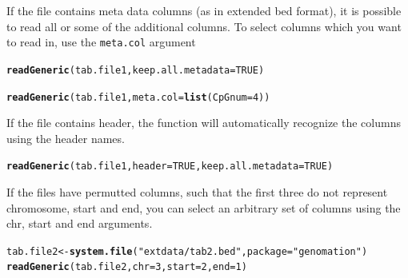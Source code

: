 \documentclass{article}\usepackage[]{graphicx}\usepackage[]{color}
\makeatletter
\newcommand{\hlnum}[1]{\textcolor[rgb]{0.686,0.059,0.569}{#1}}%
\newcommand{\hlstr}[1]{\textcolor[rgb]{0.192,0.494,0.8}{#1}}%
\newcommand{\hlstd}[1]{\textcolor[rgb]{0.345,0.345,0.345}{#1}}%
\newcommand{\hlkwb}[1]{\textcolor[rgb]{0.69,0.353,0.396}{#1}}%
\newcommand{\hlkwc}[1]{\textcolor[rgb]{0.333,0.667,0.333}{#1}}%
\newcommand{\hlkwd}[1]{\textcolor[rgb]{0.737,0.353,0.396}{\textbf{#1}}}%
\newenvironment{kframe}{%
 \def\at@end@of@kframe{}%
 \ifinner\ifhmode%
  \def\at@end@of@kframe{\end{minipage}}%
  \begin{minipage}{\columnwidth}%
 \fi\fi%
 \def\FrameCommand##1{\hskip\@totalleftmargin \hskip-\fboxsep
 \colorbox{shadecolor}{##1}\hskip-\fboxsep
     \hskip-\linewidth \hskip-\@totalleftmargin \hskip\columnwidth}%
 \MakeFramed {\advance\hsize-\width
   \@totalleftmargin\z@ \linewidth\hsize
   \@setminipage}}%
 {\par\unskip\endMakeFramed%
 \at@end@of@kframe}
\newenvironment{knitrout}{}{} %
\newcommand{\Rcode}[1]{{\texttt{#1}}}
\makeatother
\begin{document}
If the file contains meta data columns (as in extended bed format), 
it is possible to read all or some of the additional columns.
To select columns which you want to read in, use the \Rcode{meta.col} argument 
\begin{knitrout}
\color{fgcolor}\begin{kframe}
\begin{alltt}
\hlkwd{readGeneric}\hlstd{(tab.file1,} \hlkwc{keep.all.metadata} \hlstd{=} \hlnum{TRUE}\hlstd{)}

\hlkwd{readGeneric}\hlstd{(tab.file1,} \hlkwc{meta.col} \hlstd{=} \hlkwd{list}\hlstd{(}\hlkwc{CpGnum} \hlstd{=} \hlnum{4}\hlstd{))}
\end{alltt}
\end{kframe}
\end{knitrout}


If the file contains header, the function will automatically recognize the 
columns using the header names.
\begin{knitrout}
\color{fgcolor}\begin{kframe}
\begin{alltt}
\hlkwd{readGeneric}\hlstd{(tab.file1,} \hlkwc{header} \hlstd{=} \hlnum{TRUE}\hlstd{,} \hlkwc{keep.all.metadata} \hlstd{=} \hlnum{TRUE}\hlstd{)}
\end{alltt}
\end{kframe}
\end{knitrout}



If the files have permutted columns, such that the first three do not represent
chromosome, start and end, you can select an arbitrary set of columns using the
chr, start and end arguments.
\begin{knitrout}
\color{fgcolor}\begin{kframe}
\begin{alltt}
\hlstd{tab.file2} \hlkwb{<-} \hlkwd{system.file}\hlstd{(}\hlstr{"extdata/tab2.bed"}\hlstd{,} \hlkwc{package} \hlstd{=} \hlstr{"genomation"}\hlstd{)}
\hlkwd{readGeneric}\hlstd{(tab.file2,} \hlkwc{chr} \hlstd{=} \hlnum{3}\hlstd{,} \hlkwc{start} \hlstd{=} \hlnum{2}\hlstd{,} \hlkwc{end} \hlstd{=} \hlnum{1}\hlstd{)}
\end{alltt}
\end{kframe}
\end{knitrout}
\end{document}
